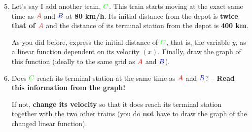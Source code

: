 \documentclass[a4paper,11pt]{article}
\newcommand{\tr}{\textcolor{red}}
\newcommand{\tb}{\textcolor{blue}}
\newcommand{\tg}{\textcolor{green}}
\begin{document}
\newpage

\begin{enumerate}[label=(\alph*),topsep=0pt]
 \setcounter{enumi}{4}
 \item Let's say I add another train, $\tg{C}$. This train starts moving at the
  exact same time as $\tr{A}$ and $\tb{B}$ at \textbf{80 km/h}. Its initial
  distance from the depot is \textbf{twice that of $\tr{A}$} and the distance of
  its terminal station from the depot is \textbf{400 km}.

  As you did before, express the initial distance of $\tg{C}$, that is, the
  variable $y$, as a linear function dependent on its velocity $(x)$. Finally,
  draw the graph of this function (ideally to the same grid as $\tr{A}$ and
  $\tb{B}$).
 \item Does $\tg{C}$ reach its terminal station at the same time as $\tr{A}$ and
  $\tb{B}$? -- \textbf{Read this information from the graph!}

  If not, \textbf{change its velocity} so that it does reach its terminal
  station together with the two other trains (you do \textbf{not} have to draw
  the graph of the changed linear function).
\end{enumerate}
\end{document}
